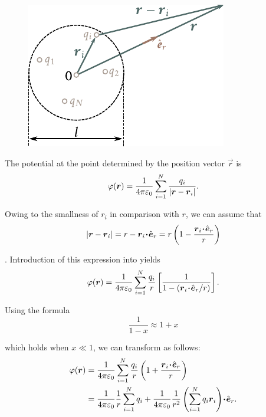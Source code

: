 \begin{figure}[t]
	\begin{center}
		\includegraphics[scale=0.95]{figures/ch_01/fig_1_16.pdf}
		\caption[]{}
		\label{fig:1_16}
	\end{center}
	\vspace{-1.0cm}
\end{figure}

The potential at the point determined by the position vector $\vec{r}$ is
\begin{equation}\label{eq:1_63}
	\varphi(\boldsymbol{r}) = \frac{1}{4\pi\varepsilon_0} \sum_{i=1}^N \frac{q_i}{\left| \boldsymbol{r} - \boldsymbol{r}_i \right|}.
\end{equation}

\noindent
Owing to the smallness of $r_i$ in comparison with $r$, we can assume that
\begin{equation*}
	\left| \boldsymbol{r} - \boldsymbol{r}_i \right| = r - \boldsymbol{r}_i\!\boldsymbol{\cdot}\!\hat{\boldsymbol{e}}_{r} = r\left(1 - \frac{\boldsymbol{r}_i\!\boldsymbol{\cdot}\!\hat{\boldsymbol{e}}_{r}}{r}\right)
\end{equation*}

. Introduction of this expression into
 yields
\begin{equation}\label{eq:1_64}
	\varphi(\boldsymbol{r}) = \frac{1}{4\pi\varepsilon_0} \sum_{i=1}^N \frac{q_i}{r} \left[\frac{1}{1 - \left(\boldsymbol{r}_i\!\boldsymbol{\cdot}\!\hat{\boldsymbol{e}}_{r}/r\right)}\right].
\end{equation}

\noindent
Using the formula
\begin{equation*}
	\frac{1}{1-x} \approx 1 + x
\end{equation*}

\noindent
which holds when $x\ll 1$, we can transform  as follows:
\begin{align}
	\varphi(\boldsymbol{r}) &= \frac{1}{4\pi\varepsilon_0} \sum_{i=1}^N \frac{q_i}{r} \left(1 + \frac{\boldsymbol{r}_i\!\boldsymbol{\cdot}\!\hat{\boldsymbol{e}}_{r}}{r}\right)\nonumber\\
	&= \frac{1}{4\pi\varepsilon_0} \frac{1}{r} \sum_{i=1}^N q_i + \frac{1}{4\pi\varepsilon_0} \frac{1}{r^2} \left(\sum_{i=1}^N q_i \boldsymbol{r}_i\right)\!\boldsymbol{\cdot}\!\hat{\boldsymbol{e}}_{r}. \label{eq:1_65}
\end{align}

